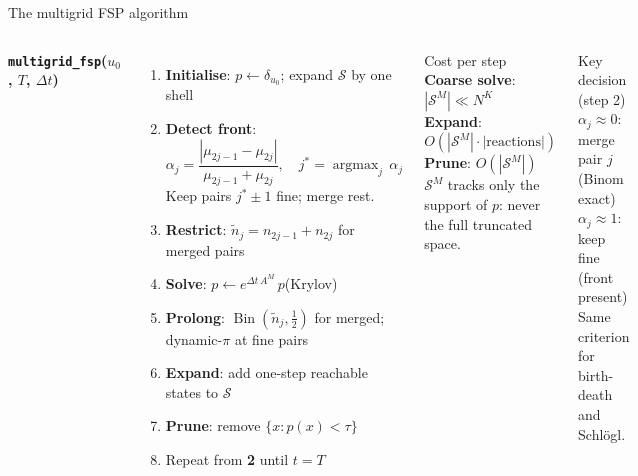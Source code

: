 \documentclass[10pt,aspectratio=169]{beamer}
\newcommand{\Bin}{\operatorname{Bin}}
\begin{document}

\begin{frame}{The multigrid FSP algorithm}

\begin{columns}[T]

\textbf{\texttt{multigrid\_fsp}($u_0$, $T$, $\Delta t$)}\\[0.4em]

\begin{enumerate}\setlength\itemsep{0.25em}
  \item \textbf{Initialise}: $p \leftarrow \delta_{u_0}$;\; expand $\mathcal{S}$ by one shell

  \item \textbf{Detect front}:
    \[ \alpha_j = \frac{|\mu_{2j-1} - \mu_{2j}|}{\mu_{2j-1}+\mu_{2j}}, \quad
       j^* = \operatorname{argmax}_j\,\alpha_j \]
    Keep pairs $j^*\!\pm\!1$ fine; merge rest.

  \item \textbf{Restrict}: $\tilde n_j = n_{2j-1}+n_{2j}$ for merged pairs

  \item \textbf{Solve}: $p \leftarrow e^{\Delta t\,A^M}\,p$\quad (Krylov)

  \item \textbf{Prolong}: $\Bin(\tilde n_j,\tfrac12)$ for merged;
    dynamic-$\pi$ at fine pairs

  \item \textbf{Expand}: add one-step reachable states to $\mathcal{S}$

  \item \textbf{Prune}: remove $\{x : p(x) < \tau\}$

  \item Repeat from \textbf{2} until $t = T$
\end{enumerate}

\vspace{0.5em}
\begin{block}{Cost per step}
  \textbf{Coarse solve}: $|\mathcal{S}^M| \ll N^K$\\
  \textbf{Expand}: $O(|\mathcal{S}^M| \cdot |\text{reactions}|)$\\
  \textbf{Prune}: $O(|\mathcal{S}^M|)$\\[0.4em]
  $\mathcal{S}^M$ tracks only the support of $p$: never the full truncated space.
\end{block}

\vspace{0.5em}
\begin{block}{Key decision (step 2)}
  $\alpha_j \approx 0$: merge pair $j$ (Binom exact)\\
  $\alpha_j \approx 1$: keep fine (front present)\\[0.3em]
  Same criterion for birth-death and Schl\"{o}gl.
\end{block}

\end{columns}

\end{frame}
\end{document}

